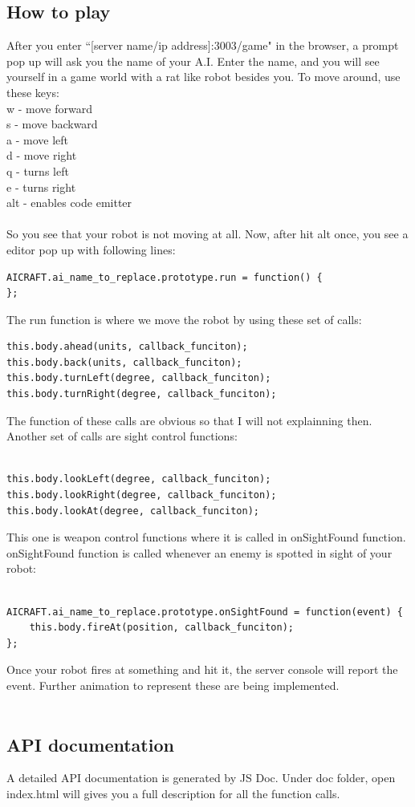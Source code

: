 \documentclass[12pt]{article}
\begin{document}
{\color{red}
\subsection{How to play}
After you enter ``[server name/ip address]:3003/game" in the browser, a prompt pop up will ask you the name of your A.I. Enter the name, and you will see yourself in a game world with a rat like robot besides you. To move around, use these keys:\\
w - move forward\\
s - move backward\\
a - move left\\
d - move right\\
q - turns left\\
e - turns right\\
alt - enables code emitter\\
\\
So you see that your robot is not moving at all. Now, after hit alt once, you see a editor pop up with following lines:\\
\begin{verbatim}
AICRAFT.ai_name_to_replace.prototype.run = function() {
};
\end{verbatim}
The run function is where we move the robot by using these set of calls:
\\
\begin{verbatim}
this.body.ahead(units, callback_funciton);
this.body.back(units, callback_funciton);
this.body.turnLeft(degree, callback_funciton);
this.body.turnRight(degree, callback_funciton);
\end{verbatim}
The function of these calls are obvious so that I will not explainning then. Another set of calls are sight control functions:\\
\\
\begin{verbatim}
this.body.lookLeft(degree, callback_funciton);
this.body.lookRight(degree, callback_funciton);
this.body.lookAt(degree, callback_funciton);
\end{verbatim}
This one is weapon control functions where it is called in onSightFound function. onSightFound function is called whenever an enemy is spotted in sight of your robot:\\
\\
\begin{verbatim}
AICRAFT.ai_name_to_replace.prototype.onSightFound = function(event) {
	this.body.fireAt(position, callback_funciton);
};
\end{verbatim}
Once your robot fires at something and hit it, the server console will report the event. Further animation to represent these are being implemented.\\
\\

\subsection{API documentation}
	A detailed API documentation is generated by JS Doc. Under doc folder, open index.html will gives you a full description for all the function calls.
}
\end{document}
